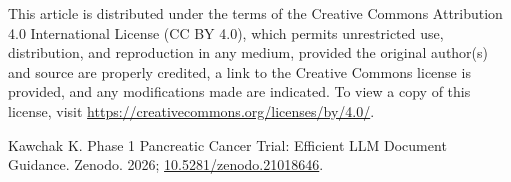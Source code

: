 This article is distributed under the terms of the Creative Commons Attribution 4.0
International License (CC BY 4.0), which permits unrestricted use, distribution, and
reproduction in any medium, provided the original author(s) and source are properly
credited, a link to the Creative Commons license is provided, and any modifications
made are indicated. To view a copy of this license, visit
\url{https://creativecommons.org/licenses/by/4.0/}.

Kawchak K. Phase 1 Pancreatic Cancer Trial: Efficient LLM Document Guidance.
Zenodo. 2026; \href{https://doi.org/10.5281/zenodo.21018646}{10.5281/zenodo.21018646}.

\clearpage

\begingroup\raggedright\nocite{*}\endgroup
